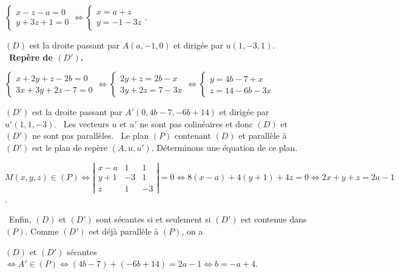 \documentclass[11pt,a4paper]{article}
\begin{document}
\begin{center}
$\left\{
\begin{array}{l}
x-z-a=0\\
y+3z+1=0
\end{array}
\right.\Leftrightarrow\left\{
\begin{array}{l}
x=a+z\\
y=-1-3z
\end{array}
\right.$.
\end{center}

$(D)$ est la droite passant par $A(a,-1,0)$ et dirigée par $u(1,-3,1)$.
 \textbullet~\textbf{Repère de $(D')$.}

\begin{center}$\left\{
\begin{array}{l}
x+2y+z-2b=0\\
3x+3y+2z-7=0
\end{array}
\right.\Leftrightarrow\left\{
\begin{array}{l}
2y+z=2b-x\\
3y+2z=7-3x
\end{array}
\right.\Leftrightarrow\left\{
\begin{array}{l}
y=4b-7+x\\
z=14-6b-3x
\end{array}
\right.$
\end{center}
$(D')$ est la droite passant par $A'(0,4b-7,-6b+14)$ et dirigée par $u'(1,1,-3)$.
\textbullet~Les vecteurs $u$ et $u'$ ne sont pas colinéaires et donc $(D)$ et $(D')$ ne sont pas parallèles.
\textbullet~Le plan $(P)$ contenant $(D)$ et parallèle à $(D')$ est le plan de repère $(A,u,u')$. Déterminons une équation de ce plan.

\begin{center}
$M(x,y,z)\in(P)\Leftrightarrow
\left|
\begin{array}{ccc}
x-a&1&1\\
y+1&-3&1\\
z&1&-3
\end{array}\right|=0\Leftrightarrow 8(x-a)+4(y+1)+4z=0\Leftrightarrow2x+y+z=2a-1$.
\end{center}
\textbullet~Enfin, $(D)$ et $(D')$ sont sécantes si et seulement si $(D')$ est contenue dans $(P)$. Comme $(D')$ est déjà parallèle à $(P)$, on a

\begin{center}
$(D)$ et $(D')$ sécantes $\Leftrightarrow A'\in(P)\Leftrightarrow(4b-7)+(-6b+14)=2a-1\Leftrightarrow b=-a+4$.
\end{center}
\end{document}
